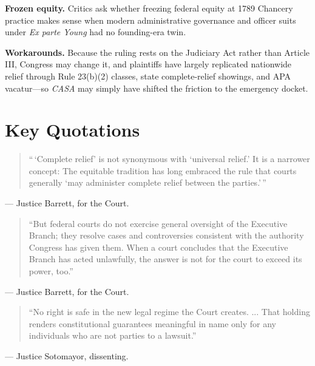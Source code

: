 \documentclass[12pt]{article}
\begin{document}
\textbf{Frozen equity.} Critics ask whether freezing federal equity at 1789 Chancery practice makes sense when modern administrative governance and officer suits under \textit{Ex parte Young} had no founding-era twin.

\textbf{Workarounds.} Because the ruling rests on the Judiciary Act rather than Article III, Congress may change it, and plaintiffs have largely replicated nationwide relief through Rule 23(b)(2) classes, state complete-relief showings, and APA vacatur---so \textit{CASA} may simply have shifted the friction to the emergency docket.

\section{Key Quotations}

\begin{quote}
``\,`Complete relief' is not synonymous with `universal relief.' It is a narrower concept: The equitable tradition has long embraced the rule that courts generally `may administer complete relief between the parties.'\,''
\end{quote}
\noindent --- Justice Barrett, for the Court.

\begin{quote}
``But federal courts do not exercise general oversight of the Executive Branch; they resolve cases and controversies consistent with the authority Congress has given them. When a court concludes that the Executive Branch has acted unlawfully, the answer is not for the court to exceed its power, too.''
\end{quote}
\noindent --- Justice Barrett, for the Court.

\begin{quote}
``No right is safe in the new legal regime the Court creates. ... That holding renders constitutional guarantees meaningful in name only for any individuals who are not parties to a lawsuit.''
\end{quote}
\noindent --- Justice Sotomayor, dissenting.
\end{document}
